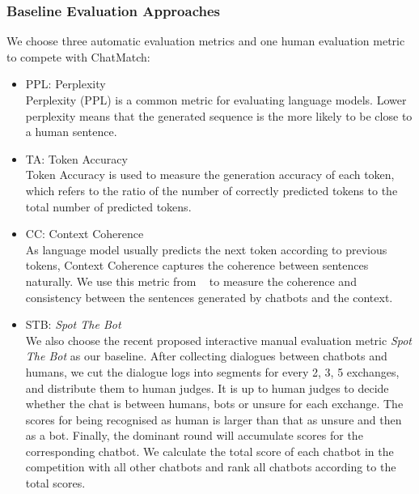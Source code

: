 \subsubsection*{Baseline Evaluation Approaches}
We choose three automatic evaluation metrics and one human evaluation 
metric to compete with ChatMatch: 
\begin{itemize}
\item PPL: Perplexity \\
Perplexity (PPL) is a common metric for evaluating language models. 
Lower perplexity means that the generated sequence is 
the more likely to be close to a human sentence.
\item TA: Token Accuracy \\
Token Accuracy is used to measure the generation accuracy 
of each token, which refers to the ratio of the number of 
correctly predicted tokens to the total number of predicted tokens.
\item CC: Context Coherence \\
As language model usually predicts the next token according 
to previous tokens, Context Coherence captures the 
coherence between sentences naturally. We use this metric 
from ~\citet{pang-etal-2020-towards} to measure the coherence and 
consistency between the sentences generated by chatbots and the 
context.
\item STB: \textit{Spot The Bot}  \\
We also choose the recent proposed interactive manual evaluation metric \textit{Spot The Bot} \citep{deriu-etal-2020-spot} as our baseline. 
After collecting dialogues between chatbots and humans, 
we cut the dialogue logs into segments for every 2, 3, 5 exchanges, 
and distribute them to human judges. It is up to human judges to decide 
whether the chat is between humans, bots or unsure for each exchange. 
The scores for being recognised as human is larger than that as unsure and then as a bot. Finally, the dominant round will 
accumulate scores for the corresponding chatbot. 
We calculate the total score of each chatbot in the competition 
with all other chatbots and rank all chatbots according to the total scores.
\end{itemize}



